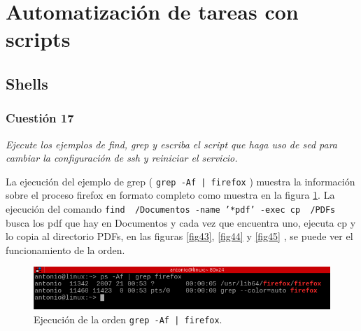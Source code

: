 \section{Automatización de tareas con scripts}
\subsection{Shells}
\subsubsection{Cuestión 17}
\textit{Ejecute los ejemplos de find, grep y escriba el script que haga uso de sed para cambiar la configuración de ssh y reiniciar el servicio.}
\newline

La ejecución del ejemplo de grep ( \texttt{grep -Af | firefox} ) muestra la información sobre el proceso firefox en formato completo como muestra en la figura \ref{fig42}. La ejecución del comando \texttt{find ~/Documentos -name '*pdf' -exec cp {} ~/PDFs \;} busca los pdf que hay en Documentos y cada vez que encuentra uno, ejecuta cp y lo copia al directorio PDFs, en las figuras \ref{fig43}, \ref{fig44} y \ref{fig45} , se puede ver el funcionamiento de la orden.

\begin{figure}[H]
    \begin{center}
        \includegraphics[scale=0.6]{imagenes/img45}
        \caption{Ejecución de la orden \texttt{grep -Af | firefox}.}
        \label{fig42}
    \end{center}
\end{figure}

